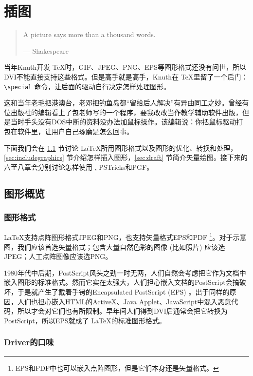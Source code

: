 \chapter{插图}\label{sec:graphics}

\begin{quotation}
A picture says more than a thousand words.
\begin{flushright}
--- Shakespeare
\end{flushright}
\end{quotation}

当年Knuth开发 \TeX 时，GIF、JPEG、PNG、EPS等图形格式还没有问世，所以DVI不能直接支持这些格式。但是高手就是高手，Knuth在 \TeX 里留了一个后门：\verb|\special| 命令，让后面的驱动自行决定怎样处理图形。

这和当年老毛把港澳台，老邓把钓鱼岛都“留给后人解决”有异曲同工之妙。曾经有位出版社的编辑看上了包老师写的一个程序，要我改改当作教学辅助软件出版，但是当时手头没有DOS中断的资料没办法加鼠标操作。该编辑说：你把鼠标驱动打包在软件里，让用户自己琢磨是怎么回事。

下面我们会在 \ref{sec:graphics_format} 节讨论 \LaTeX 所用图形格式以及图形的优化、转换和处理，\ref{sec:includegraphics} 节介绍怎样插入图形，\ref{sec:draft} 节简介矢量绘图。接下来的六至八章会分别讨论怎样使用 \MP, PSTricks和PGF。

\section{图形概览}
\label{sec:graphics_format}

\subsection{图形格式}

\LaTeX 支持点阵图形格式JPEG和PNG，也支持矢量格式EPS和PDF \footnote{EPS和PDF中也可以嵌入点阵图形，但是它们本身还是矢量格式。}。对于示意图，我们应该首选矢量格式；包含大量自然色彩的图像 (比如照片) 应该选JPEG；人工点阵图像应该选PNG。

1980年代中后期，PostScript风头之劲一时无两，人们自然会考虑把它作为文档中嵌入图形的标准格式。然而它实在太强大，人们担心嵌入文档的PostScript会搞破坏，于是就产生了戴着手铐的Encapsulated PostScript (EPS) 。出于同样的原因，人们也担心嵌入HTML的ActiveX、Java Applet、JavaScript中混入恶意代码，所以才会对它们也有所限制。早年间人们得到DVI后通常会把它转换为PostScript，所以EPS就成了 \LaTeX 的标准图形格式。
 
\subsection{Driver的口味}

